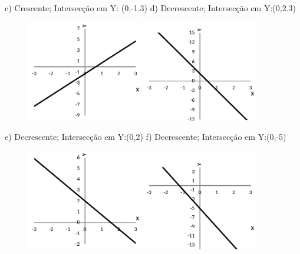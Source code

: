 \begin{respostas}{3}
c) Crescente; Intersecção em Y: (0,-1.3) \qquad d) Decrescente; Intersecção em Y:(0,2.3)

\begin{figure}[H]
	\includegraphics[width=0.45\textwidth]{capitulos/funcao_do_primeiro_grau/media/image59.pdf} 
	\includegraphics[width=0.45\textwidth]{capitulos/funcao_do_primeiro_grau/media/image60.pdf}
\end{figure}

e) Decrescente; Intersecção em Y:(0,2) \qquad f) Decrescente; Intersecção em Y:(0,-5)

\begin{figure}[H]
	\includegraphics[width=0.45\textwidth]{capitulos/funcao_do_primeiro_grau/media/image61.pdf} 
	\includegraphics[width=0.45\textwidth]{capitulos/funcao_do_primeiro_grau/media/image62.pdf}
\end{figure}


\end{respostas}
